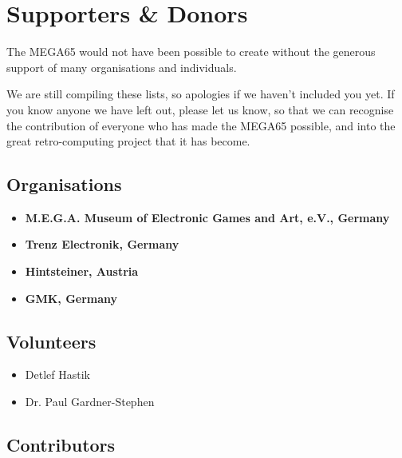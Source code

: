 \chapter{Supporters \& Donors}

The MEGA65 would not have been possible to create without the generous support
of many organisations and individuals.

We are still compiling these lists, so apologies if we haven't included you yet.  If you
know anyone we have left out, please let us know, so that we can recognise the contribution
of everyone who has made the MEGA65 possible, and into the great retro-computing project
that it has become.

\section{Organisations}

\begin{itemize}
\item {\bf M.E.G.A. Museum of Electronic Games and Art, e.V., Germany} 
\item {\bf Trenz Electronik, Germany} 
\item {\bf Hintsteiner, Austria} 
\item {\bf GMK, Germany} 
\end{itemize}

\section{Volunteers}

\begin{itemize}
\item Detlef Hastik    
\item Dr. Paul Gardner-Stephen   
\end{itemize}

\section{Contributors}

